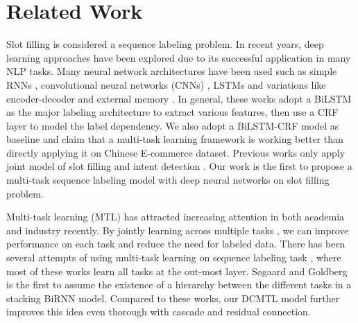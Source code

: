 \section{Related Work}


Slot filling is considered a sequence labeling problem.
In recent years,
deep learning approaches have been explored
due to its successful application in many NLP tasks.
Many neural network architectures have been used such as
simple RNNs \cite{yao2013recurrent,mesnil2015using}, 
convolutional neural networks (CNNs) \cite{xu2013convolutional},
LSTMs \cite{yao2014spoken} 
and variations like encoder-decoder \cite{zhu2017encoder,zhai2017neural} 
and external memory \cite{peng2015recurrent}.
In general, these works adopt a BiLSTM as the major labeling architecture
to extract various features, 
then use a CRF layer \cite{huang2015bidirectional} to model 
the label dependency.
We also adopt a BiLSTM-CRF model as baseline and claim that
a multi-task learning framework is working better than directly 
applying it on Chinese E-commerce dataset.
Previous works
only apply joint model of slot filling and intent detection \cite{zhang2016joint,liu2016joint}.
Our work is the first to propose a multi-task sequence labeling model with 
deep neural networks on slot filling problem.

Multi-task learning (MTL) has attracted increasing attention
in both academia and industry recently.
By jointly learning across multiple tasks \cite{caruana1998multitask}, we can
improve performance on each task and reduce the need for labeled data.
There has been several attempts of using multi-task learning on 
sequence labeling task \cite{peng2016multi,peng2016improving,yang2017transfer},
where most of these works learn all tasks at the out-most layer.
Søgaard and Goldberg  is the first to 
assume the existence of a hierarchy between the different tasks in a stacking BiRNN model.
Compared to these works, our DCMTL model further improves this 
idea even thorough with cascade and residual connection.


